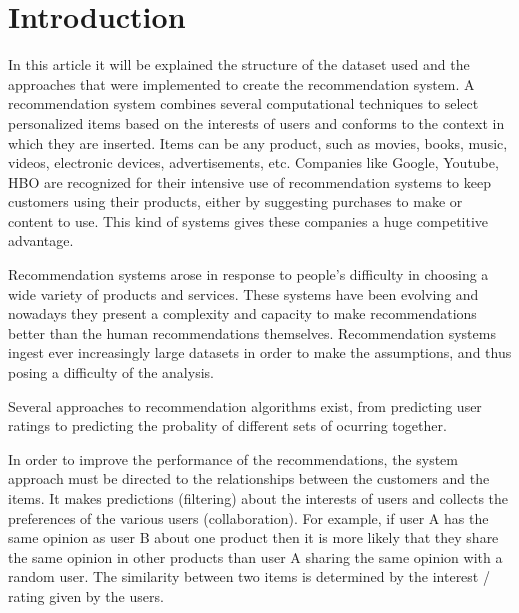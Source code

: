 \section{Introduction}
\label{intro}
In this article it will be explained the structure of the dataset used and the approaches that
were implemented to create the recommendation system.
A recommendation system combines several computational techniques to select personalized items based on the
interests of users and conforms to the context in which they are inserted.
Items can be any product, such as movies, books, music, videos, electronic devices, advertisements, etc.
Companies like Google, Youtube, HBO are recognized for their intensive use of recommendation systems to 
keep customers using their products, either by suggesting  purchases to make or content to use.
This kind of systems gives these companies a huge competitive advantage.

Recommendation systems arose in response to people's difficulty in choosing a wide variety of products and services.
These systems have been evolving and nowadays they present a complexity and capacity to make recommendations better
than the human recommendations themselves. Recommendation systems ingest ever increasingly large datasets in 
order to make the assumptions, and thus posing a difficulty of the analysis.

Several approaches to recommendation algorithms exist, from predicting user ratings to predicting the probality
of different sets of ocurring together.

In order to improve the performance of the recommendations, the system approach must be directed to the relationships
between the customers and the items. 
It makes predictions (filtering) about the interests of users and collects the preferences of the various users (collaboration).
For example, if user A has the same opinion as user B about one product then it is more likely that they share
the same opinion in other products than user A sharing the same opinion with a random user.
The similarity between two items is determined by the interest / rating given by the users.